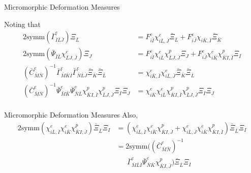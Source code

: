 \documentclass[11pt]{beamer}
\begin{document}
\begin{frame}{Micromorphic Deformation Measures}

Noting that
\begin{align*}
2\text{symm}\left(\bar{\Gamma}_{\bar{I}\bar{L}\bar{J}}^e\right)\Xi_{\bar{L}} &= F_{i\bar{I}}^e \chi_{i\bar{L},\bar{J}}^e \bar{\Xi}_{\bar{L}} + F_{i\bar{J}}^e \chi_{i\bar{K},\bar{I}}\bar{\Xi}_{\bar{K}}\\
2\text{symm}\left(\bar{\Psi}_{\bar{I}\bar{L}} \chi_{\bar{L}J,\bar{J}}^e\right)\Xi_J &= F_{i\bar{I}}^e \chi_{i\bar{L}}^e\chi_{\bar{L}J,\bar{J}}^p \Xi_{J} + F_{i\bar{J}}^e\chi_{i\bar{K}}^e\chi_{\bar{K}I,\bar{I}}^p \Xi_I\\
\left(\bar{C}_{\bar{M}\bar{N}}^e\right)^{-1} \bar{\Gamma}_{\bar{M}\bar{K}\bar{I}}^e  \bar{\Gamma}_{\bar{N}\bar{L}\bar{J}}^e\bar{\Xi}_{\bar{K}} \bar{\Xi}_{\bar{L}} &= \chi_{i\bar{K},\bar{I}}^e \chi_{i\bar{L},\bar{J}}^e \bar{\Xi}_{\bar{K}} \bar{\Xi}_{\bar{L}}\\
\left(\bar{C}_{\bar{M}\bar{N}}^e\right)^{-1} \bar{\Psi}_{\bar{M}\bar{K}}^e \bar{\Psi}_{\bar{N}\bar{L}}^e\chi_{\bar{K}I,\bar{I}}^p \chi_{\bar{L}J,\bar{J}}^p \Xi_I\Xi_J  &= \chi_{i\bar{K}}^e \chi_{i\bar{L}}^e \chi_{\bar{K}I,\bar{I}}^p \chi_{\bar{L}J,\bar{J}}^p \Xi_I\Xi_J\\
\end{align*}

\end{frame}

\begin{frame}{Micromorphic Deformation Measures}
Also,
\begin{align*}
2\text{symm}\left(\chi_{i\bar{L},\bar{I}}^e\chi_{i\bar{K}}^e \chi_{\bar{K}I, \bar{J}}^p\right) \bar{\Xi}_{\bar{L}} \Xi_I &=\left(\chi_{i\bar{L},\bar{I}}^e\chi_{i\bar{K}}^e \chi_{\bar{K}I, \bar{J}}^p+\chi_{i\bar{L},\bar{J}}^e \chi_{i\bar{K}}^e\chi_{\bar{K}I,\bar{I}}^p \right)\bar{\Xi}_{\bar{L}} \Xi_{I}\\
&= 2\text{symm}\bigg(\left(\bar{C}_{\bar{M}\bar{N}}^e\right)^{-1}\\
&\ \ \ \ \ \ \ \bar{\Gamma}_{\bar{M}\bar{L}\bar{I}}^e \bar{\Psi}_{\bar{N}\bar{K}}^e\chi_{\bar{K}I,\bar{J}}^p\bigg)\bar{\Xi}_{\bar{L}}\Xi_I\\
\end{align*}

\end{frame}
\end{document}
